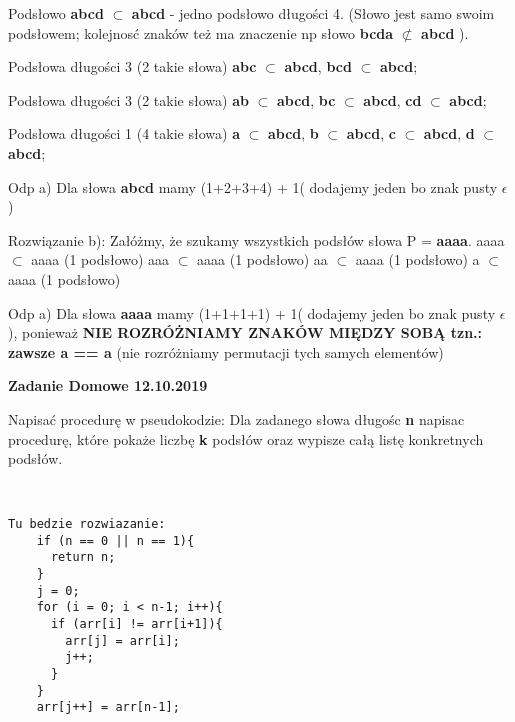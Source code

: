 Podsłowo {\bf abcd} $\subset$ {\bf abcd} - jedno podsłowo długości 4. (Słowo jest samo swoim podsłowem; kolejnosć znaków też ma znaczenie np słowo {\bf bcda} $\not\subset $ {\bf abcd}  ).
\newline

Podsłowa długości 3 (2 takie słowa)
{\bf abc} $\subset$ {\bf abcd},
{\bf bcd} $\subset$ {\bf abcd};

Podsłowa długości 3 (2 takie słowa)
{\bf ab} $\subset$ {\bf abcd},
{\bf bc} $\subset$ {\bf abcd},
{\bf cd} $\subset$ {\bf abcd};

Podsłowa długości 1 (4 takie słowa)
{\bf a} $\subset$ {\bf abcd},
{\bf b} $\subset$ {\bf abcd},
{\bf c} $\subset$ {\bf abcd},
{\bf d} $\subset$ {\bf abcd};

Odp a) Dla słowa { \bf abcd} mamy (1+2+3+4) + 1( dodajemy jeden bo znak pusty $\epsilon$ )

Rozwiązanie b):
Załóżmy, że szukamy wszystkich podsłów słowa P = {\bf aaaa}. 
aaaa $\subset$  aaaa (1 podsłowo)
aaa $\subset$  aaaa (1 podsłowo)
aa $\subset$  aaaa (1 podsłowo)
a $\subset$  aaaa (1 podsłowo)

Odp a) Dla słowa { \bf aaaa} mamy (1+1+1+1) + 1( dodajemy jeden bo znak pusty $\epsilon$ ), ponieważ {\bf NIE ROZRÓŻNIAMY ZNAKÓW MIĘDZY SOBĄ tzn.: zawsze a == a} (nie rozróżniamy permutacji tych samych elementów)


\begin{tcolorbox}
	\textbf{Zadanie Domowe 12.10.2019} \newline
	
	Napisać procedurę w pseudokodzie:
	Dla zadanego słowa długośc {\bf n} napisac procedurę, które pokaże liczbę {\bf k}
	podsłów oraz wypisze całą listę konkretnych podsłów.
\end{tcolorbox}

\begin{lstlisting}


Tu bedzie rozwiazanie:
    if (n == 0 || n == 1){    
      return n;        
    }        
    j = 0;    
    for (i = 0; i < n-1; i++){      
      if (arr[i] != arr[i+1]){        
        arr[j] = arr[i];       
        j++;      
      }       
    }      
    arr[j++] = arr[n-1];
\end{lstlisting}



